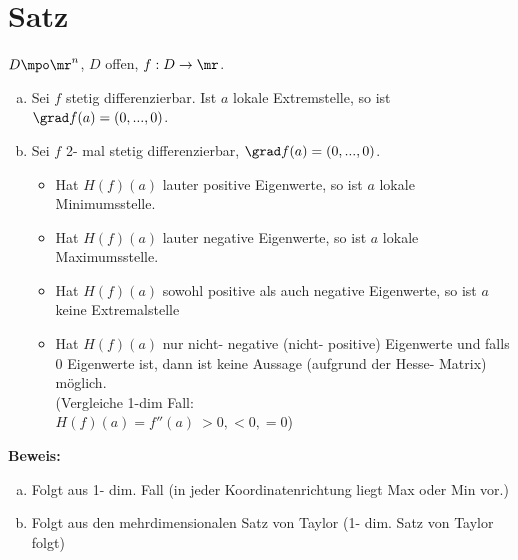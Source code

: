 \section{Satz}
	$ D\mpo\mr^n $, $ D $ offen, $ f:D\rightarrow\mr $.
	\begin{enumerate}[a)]
		\item Sei $ f $ stetig differenzierbar. Ist $ a $ lokale Extremstelle, so ist $ \grad f(a)=(0,...,0) $.
		\item  Sei $ f $ 2- mal stetig differenzierbar, $ \grad f(a)=(0,...,0) $.
		\begin{itemize}
			\item  Hat $ H(f)(a) $ lauter positive Eigenwerte, so ist $ a $ lokale Minimumsstelle.
			\item  Hat $ H(f)(a) $ lauter negative Eigenwerte, so ist $ a $ lokale Maximumsstelle.
			\item  Hat $ H(f)(a) $ sowohl positive als auch negative Eigenwerte, so ist $ a $ keine Extremalstelle
			\item Hat $ H(f)(a) $ nur nicht- negative (nicht- positive) Eigenwerte und falls 0 Eigenwerte ist, dann ist keine Aussage (aufgrund der Hesse- Matrix) möglich.\\
			(Vergleiche 1-dim Fall:\\
			$ H(f)(a)=f''(a)\ >0,<0,=0 $)
		\end{itemize}
	\end{enumerate}
	
	\textbf{Beweis:}
	\begin{enumerate}[a)]
		\item Folgt aus 1- dim. Fall (in jeder Koordinatenrichtung liegt Max oder Min vor.)
		\item  Folgt aus den mehrdimensionalen Satz von Taylor (1- dim. Satz von Taylor folgt)
	\end{enumerate}
	
